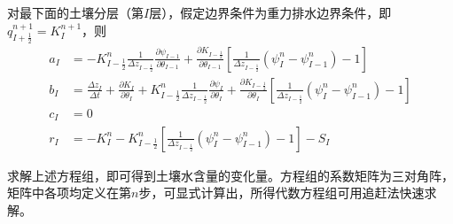 对最下面的土壤分层（第$I$层），假定边界条件为重力排水边界条件，即$q_{I+\frac{1}{2}}^{n+1}=K_{I}^{n+1}$，则
\begin{equation}
  \begin{aligned}
    a_I &= - K_{I-\frac{1}{2}}^{n} \frac{1}{\Delta z_{I-\frac{1}{2}}}
    \frac{\partial \psi_{I-1}}{\partial \theta_{I-1}}+\frac{\partial K_{I-\frac{1}{2}}}
    {\partial \theta_{I-1}}\left[\frac{1}{\Delta z_{I-\frac{1}{2}}}\left(\psi_{I}^{n}-\psi_{I-1}^{n}\right)-1\right] \\
    b_I &= \frac{\Delta z_{I}}{\Delta t}+\frac{\partial K_{I}}
    {\partial \theta_{I}}+K_{I-\frac{1}{2}}^{n} \frac{1}{\Delta z_{I-\frac{1}{2}}} \frac{\partial \psi_{I}}{\partial \theta_{I}}+
    \frac{\partial K_{I-\frac{1}{2}}}{\partial \theta_{I}}\left[\frac{1}{\Delta z_{I-\frac{1}{2}}}\left(\psi_{I}^{n}-\psi_{I-1}^{n}\right)-1\right] \\
    c_I &= 0 \\
    r_I &= -K_{I}^{n}-K_{I-\frac{1}{2}}^{n}\left[\frac{1}{\Delta z_{I-\frac{1}{2}}}\left(\psi_{I}^{n}-\psi_{I-1}^{n}\right)-1\right]-S_{I}
  \end{aligned}
\end{equation}

求解上述方程组，即可得到土壤水含量的变化量。方程组的系数矩阵为三对角阵，矩阵中各项均定义在第$n$步，可显式计算出，所得代数方程组可用追赶法快速求解。

